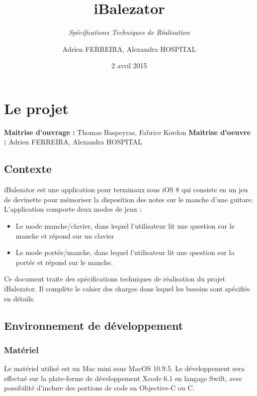 \documentclass{scrreprt}
\begin{document}

\title{iBalezator}
\subtitle{\textit{Spécifications Techniques de Réalisation}\vspace{-5ex}}
\date{2 avril 2015}
\author{Adrien FERREIRA, Alexandra HOSPITAL}
\maketitle
\tableofcontents \newpage


\chapter{Le projet}
\noindent \textbf{Maitrise d’ouvrage :} Thomas Baspeyras, Fabrice Kordon \newline
\noindent \textbf{Maitrise d’oeuvre :} Adrien FERREIRA, Alexandra HOSPITAL\newline

\section{Contexte}

iBalezator est une application pour terminaux sous iOS 8 qui consiste en un jeu de devinette pour mémoriser la disposition des notes sur le manche d’une guitare. L'application comporte deux modes de jeux :
\begin{itemize}
\item Le mode manche/clavier, dans lequel l'utilisateur lit une question sur le manche et répond sur un clavier
\item Le mode portée/manche, dans lequel l'utilisateur lit une question sur la portée et répond sur le manche.
\end{itemize}

\medbreak

Ce document traite des spécifications techniques de réalisation du projet iBalezator. Il complète le cahier des charges dans lequel les besoins sont spécifiés en détails.\newline

\section{Environnement de développement}
\subsection{Matériel}

Le matériel utilisé est un Mac mini sous MacOS 10.9.5. 
Le développement sera effectué sur la plate-forme de développement Xcode 6.1 en langage Swift, avec possibilité d'inclure des portions de code en Objective-C ou C.
\end{document}
